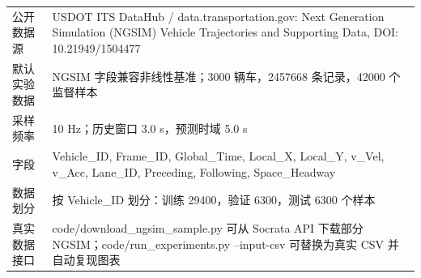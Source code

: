 \begin{tabularx}{\textwidth}{lX}
\toprule
公开数据源 & USDOT ITS DataHub / data.transportation.gov: Next Generation Simulation (NGSIM) Vehicle Trajectories and Supporting Data, DOI: 10.21949/1504477 \\ 
默认实验数据 & NGSIM 字段兼容非线性基准；3000 辆车，2457668 条记录，42000 个监督样本 \\ 
采样频率 & 10 Hz；历史窗口 3.0 s，预测时域 5.0 s \\ 
字段 & Vehicle\_ID, Frame\_ID, Global\_Time, Local\_X, Local\_Y, v\_Vel, v\_Acc, Lane\_ID, Preceding, Following, Space\_Headway \\ 
数据划分 & 按 Vehicle\_ID 划分：训练 29400，验证 6300，测试 6300 个样本 \\ 
真实数据接口 & code/download\_ngsim\_sample.py 可从 Socrata API 下载部分 NGSIM；code/run\_experiments.py --input-csv 可替换为真实 CSV 并自动复现图表 \\ 
\bottomrule
\end{tabularx}
